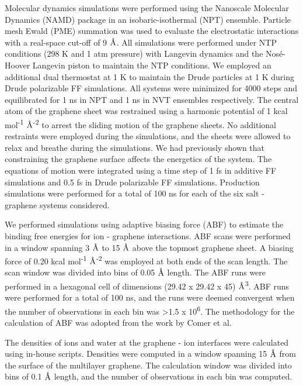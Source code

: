 Molecular dynamics simulations were performed using the Nanoscale Molecular Dynamics (NAMD) package\supercite{phillips_scalable_2005,phillips_scalable_2020} in an isobaric-isothermal (NPT) ensemble. Particle mesh Ewald\supercite{darden_particle_1993} (PME) summation was used to evaluate the electrostatic interactions with a real-space cut-off of 9 $\text{\normalfont\AA}$. All simulations were performed under NTP conditions (298 K and 1 atm pressure) with Langevin dynamics and the Nos\'{e}-Hoover Langevin piston to maintain the NTP conditions. We employed an additional dual thermostat at 1 K to maintain the Drude particles at 1 K during Drude polarizable FF simulations. All systems were minimized for 4000 steps and equilibrated for 1 ns in NPT and 1 ns in NVT ensembles respectively. The central atom of the graphene sheet was restrained using a harmonic potential of 1 kcal mol\textsuperscript{-1} $\text{\normalfont\AA}$\textsuperscript{-2} to arrest the sliding motion of the graphene sheets. No additional restraints were employed during the simulations, and the sheets were allowed to relax and breathe during the simulations. We had previously shown that constraining the graphene surface affects the energetics of the system.\supercite{h_polarization_2021} The equations of motion were integrated using a time step of 1 fs in additive FF simulations and 0.5 fs in Drude polarizable FF simulations. Production simulations were performed for a total of 100 ns for each of the six salt - graphene systems considered.

We performed simulations using adaptive biasing force (ABF) to estimate the binding free energies for ion - graphene interactions. ABF scans were performed in a window spanning 3 $\text{\normalfont\AA}$ to 15 $\text{\normalfont\AA}$ above the topmost graphene sheet. A biasing force of 0.20 kcal mol\textsuperscript{-1} $\text{\normalfont\AA}$\textsuperscript{-2} was employed at both ends of the scan length. The scan window was divided into bins of 0.05 $\text{\normalfont\AA}$ length. The ABF runs were performed in a hexagonal cell of dimensions (29.42 x 29.42 x 45) $\text{\normalfont\AA}$\textsuperscript{3}. ABF runs were performed for a total of 100 ns, and the runs were deemed convergent when the number of observations in each bin was >1.5 x 10\textsuperscript{6}. The methodology for the calculation of ABF was adopted from the work by Comer et al.\supercite{comer_predicting_2015,poblete_determinants_2017}

The densities of ions and water at the graphene - ion interfaces were calculated using in-house scripts. Densities were computed in a window spanning 15 $\text{\normalfont\AA}$ from the surface of the multilayer graphene. The calculation window was divided into bins of 0.1 $\text{\normalfont\AA}$ length, and the number of observations in each bin was computed. 

